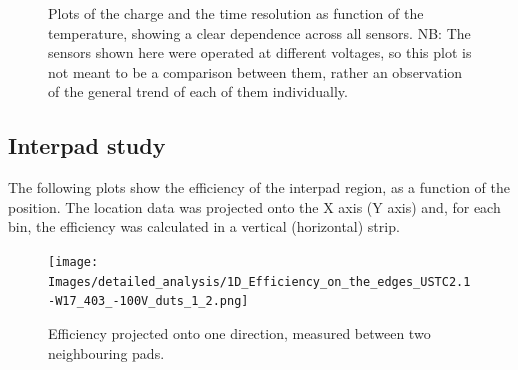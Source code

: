 \begin{figure}[h!tbp]
    \centering
    \begin{minipage}[c]{.47\linewidth}
    \end{minipage}
    \hfill
    \begin{minipage}[c]{.47\linewidth}
    \end{minipage}
    \vfill
    \begin{minipage}[c]{.47\linewidth}
        \end{minipage}
        \hfill
        \begin{minipage}[c]{.47\linewidth}
        \end{minipage}
    
    \captionsetup{width=\captionwidth}
    \caption{Plots of the charge and the time resolution as function of the temperature, showing a clear dependence across all sensors. NB: The sensors shown here were operated at different voltages, so this plot is not meant to be a comparison between them, rather an observation of the general trend of each of them individually.}
\end{figure}

\FloatBarrier
\subsection{Interpad study}\label{sec:neighbouring_pads}
The following plots show the efficiency of the interpad region, as a function of the position. The location data was projected onto the X axis (Y axis) and, for each bin, the efficiency was calculated in a vertical (horizontal) strip. 

\begin{figure}[h!tbp]
    \centering
    \texttt{[image: Images/detailed\_analysis/1D\_Efficiency\_on\_the\_edges\_USTC2.1-W17\_403\_-100V\_duts\_1\_2.png]}
    \captionsetup{width=\captionwidth}
    \caption{Efficiency projected onto one direction, measured between two neighbouring pads.}
    \label{fig:neighbouring_pads}
\end{figure}


